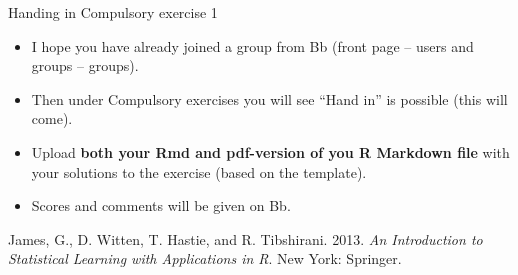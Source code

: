 \documentclass[10pt,ignorenonframetext,]{beamer}
\begin{document}
\begin{frame}{Handing in Compulsory exercise 1}
\protect\hypertarget{handing-in-compulsory-exercise-1}{}

\begin{itemize}
\item
  I hope you have already joined a group from Bb (front page -- users
  and groups -- groups).
\item
  Then under Compulsory exercises you will see ``Hand in'' is possible
  (this will come).
\item
  Upload \textbf{both your Rmd and pdf-version of you R Markdown file}
  with your solutions to the exercise (based on the template).
\item
  Scores and comments will be given on Bb.
\end{itemize}

\end{frame}

\begin{frame}

\hypertarget{refs}{}
\leavevmode\hypertarget{ref-james.etal}{}%
James, G., D. Witten, T. Hastie, and R. Tibshirani. 2013. \emph{An
Introduction to Statistical Learning with Applications in R}. New York:
Springer.

\end{frame}
\end{document}

